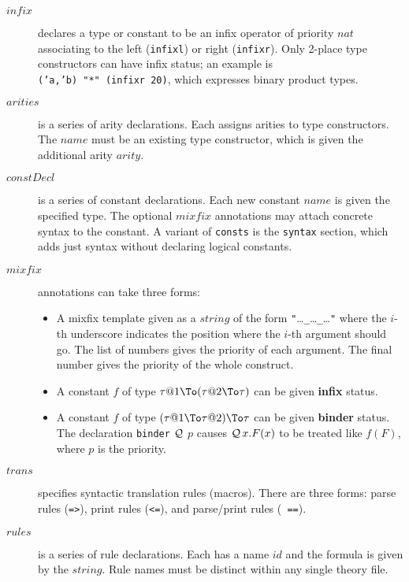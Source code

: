 \begin{description}
\item[$infix$]
  declares a type or constant to be an infix operator of priority $nat$
  associating to the left ({\tt infixl}) or right ({\tt infixr}). Only
  2-place type constructors can have infix status; an example is {\tt
  ('a,'b)~"*"~(infixr~20)}, which expresses binary product types.

\item[$arities$]
  is a series of arity declarations.  Each assigns arities to type
  constructors.  The $name$ must be an existing type constructor, which is
  given the additional arity $arity$.

\item[$constDecl$]
  is a series of constant declarations.  Each new constant $name$ is given
  the specified type.  The optional $mixfix$ annotations may
  attach concrete syntax to the constant. A variant of {\tt consts} is the
  {\tt syntax} section, which adds just syntax without
  declaring logical constants.

\item[$mixfix$] 
  annotations can take three forms:
  \begin{itemize}
  \item A mixfix template given as a $string$ of the form
    {\tt"}\dots{\tt\_}\dots{\tt\_}\dots{\tt"} where the $i$-th underscore
    indicates the position where the $i$-th argument should go.  The list
    of numbers gives the priority of each argument.  The final number gives
    the priority of the whole construct.

  \item A constant $f$ of type $\tau@1\To(\tau@2\To\tau)$ can be given {\bf
    infix} status.

  \item A constant $f$ of type $(\tau@1\To\tau@2)\To\tau$ can be given {\bf
    binder} status.  The declaration {\tt binder} $\cal Q$ $p$ causes
  ${\cal Q}\,x.F(x)$ to be treated
  like $f(F)$, where $p$ is the priority.
  \end{itemize}

\item[$trans$]
  specifies syntactic translation rules (macros).  There are three forms:
  parse rules ({\tt =>}), print rules ({\tt <=}), and parse/print rules ({\tt
  ==}).

\item[$rules$]
  is a series of rule declarations.  Each has a name $id$ and the formula is
  given by the $string$.  Rule names must be distinct within any single
  theory file.


\end{description}

